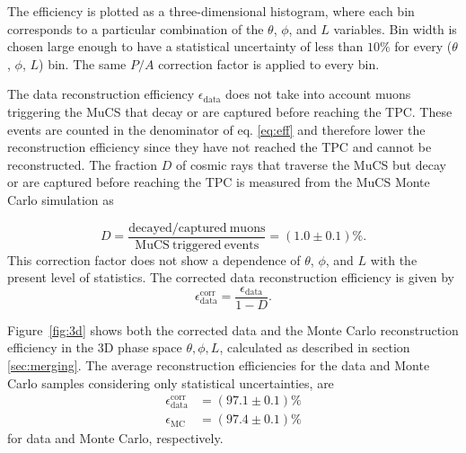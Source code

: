 \documentclass[a4paper,11pt]{article}
\begin{document}
The efficiency is plotted as a three-dimensional histogram, where each bin corresponds to a particular combination of the $\theta$, $\phi$, and $L$ variables. Bin width is chosen large enough to have a statistical uncertainty of less than $10\%$ for every ($\theta$, $\phi$, $L$) bin. The same $P/A$ correction factor is applied to every bin.

The data reconstruction efficiency $\epsilon_{\mathrm{data}}$ does not take into account muons triggering the MuCS that decay or are captured before reaching the TPC. These events are counted in the denominator of eq. \eqref{eq:eff} and therefore lower the reconstruction efficiency since they have not reached the TPC and cannot be reconstructed. The fraction $D$ of cosmic rays that traverse the MuCS but decay or are captured before reaching the TPC is measured from the MuCS Monte Carlo simulation as

\begin{equation}
D = \frac{\mathrm{decayed/captured~muons}}{\mathrm{MuCS~triggered~events}} = (1.0 \pm 0.1)\%.
\end{equation}
This correction factor does not show a dependence of $\theta$, $\phi$, and $L$ with the present level of statistics. The corrected data reconstruction efficiency is given by
\begin{equation}\label{eq:dcorr}
\epsilon_{\mathrm{data}}^{\mathrm{corr}} =  \frac{\epsilon_{\mathrm{data}}}{1-D}.
\end{equation}

Figure~\ref{fig:3d} shows both the corrected data and the Monte Carlo reconstruction efficiency in the 3D phase space $\theta, \phi, L$, calculated as described in section \ref{sec:merging}. The average reconstruction efficiencies for the data and Monte Carlo samples considering only statistical uncertainties, are
\begin{align}
\epsilon_{\mathrm{data}}^{\mathrm{corr}} &= (97.1 \pm 0.1)\%\\
\epsilon_{\mathrm{MC}} &= (97.4 \pm 0.1)\% \nonumber
\end{align}
for data and Monte Carlo, respectively.
\end{document}
